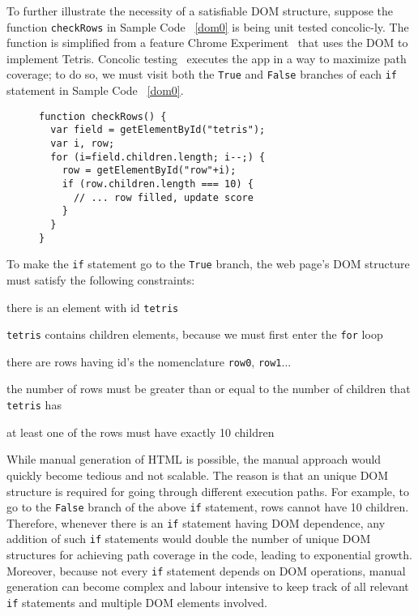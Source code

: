 To further illustrate the necessity of a satisfiable DOM structure, suppose the function {\tt checkRows} in Sample Code ~\ref{dom0} is being unit tested concolic-ly.  
The function is simplified from a feature Chrome Experiment~\cite{domtris} that uses the DOM to implement Tetris.  
Concolic testing~\cite{cute} executes the app in a way to maximize path coverage; to do so, we must visit both the {\tt True} and {\tt False} branches of each {\tt if} statement in Sample Code ~\ref{dom0}.
\begin{figure}
\begin{lstlisting}[caption=Example that needs tracing and solver. The function getElementById() is equivalent to document.getElementById(),label=dom0]
function checkRows() {
  var field = getElementById("tetris"); 
  var i, row;
  for (i=field.children.length; i--;) {
    row = getElementById("row"+i);
    if (row.children.length === 10) {
      // ... row filled, update score
    }
  }
}
\end{lstlisting}
\end{figure}

To make the {\tt if} statement go to the {\tt True} branch, the web page's DOM structure must satisfy the following constraints:
\begin {compactitem}
\item there is an element with id {\tt tetris}
\item {\tt tetris} contains children elements, because we must first enter the {\tt for} loop
\item there are rows having id's the nomenclature {\tt row0}, {\tt row1}...
\item the number of rows must be greater than or equal to the number of children that {\tt tetris} has
\item at least one of the rows must have exactly 10 children
\end {compactitem}

While manual generation of HTML is possible, the manual approach would quickly become tedious and not scalable.  
The reason is that an unique DOM structure is required for going through different execution paths.  
For example, to go to the {\tt False} branch of the above {\tt if} statement, rows cannot have 10 children.
Therefore, whenever there is an {\tt if} statement having DOM dependence, any addition of such {\tt if} statements would double the number of unique DOM structures for achieving path coverage in the code, leading to exponential growth.
Moreover, because not every {\tt if} statement depends on DOM operations, manual generation can become complex and labour intensive to keep track of all relevant {\tt if} statements and multiple DOM elements involved.



